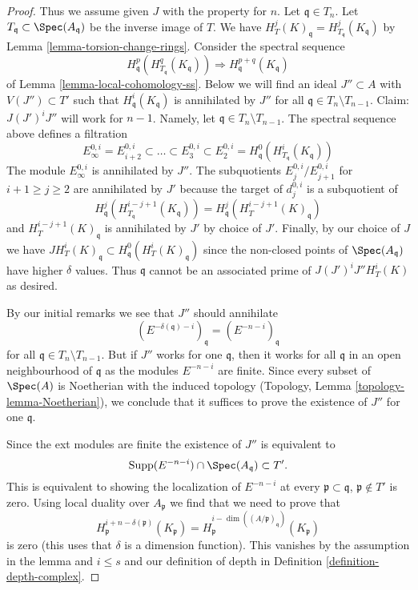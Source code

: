 \begin{proof}
\medskip\noindent
Thus we assume given $J$ with the property for $n$.
Let $\mathfrak q \in T_n$. Let $T_\mathfrak q \subset \Spec(A_\mathfrak q)$
be the inverse image of $T$. We have
$H^j_T(K)_\mathfrak q = H^j_{T_\mathfrak q}(K_\mathfrak q)$
by Lemma \ref{lemma-torsion-change-rings}.
Consider the spectral sequence
$$
H_\mathfrak q^p(H^q_{T_\mathfrak q}(K_\mathfrak q))
\Rightarrow
H^{p + q}_\mathfrak q(K_\mathfrak q)
$$
of Lemma \ref{lemma-local-cohomology-ss}.
Below we will find an ideal $J'' \subset A$ with $V(J'') \subset T'$
such that $H^i_\mathfrak q(K_\mathfrak q)$ is annihilated by $J''$ for all
$\mathfrak q \in T_n \setminus T_{n - 1}$.
Claim: $J (J')^i J''$ will work for $n - 1$.
Namely, let $\mathfrak q \in T_n \setminus T_{n - 1}$.
The spectral sequence above defines a filtration
$$
E_\infty^{0, i} = E_{i + 2}^{0, i} \subset \ldots \subset E_3^{0, i} \subset
E_2^{0, i} = H^0_\mathfrak q(H^i_{T_\mathfrak q}(K_\mathfrak q))
$$
The module $E_\infty^{0, i}$ is annihilated by $J''$.
The subquotients $E_j^{0, i}/E_{j + 1}^{0, i}$ for $i + 1 \geq j \geq 2$
are annihilated by $J'$ because the target of $d_j^{0, i}$
is a subquotient of
$$
H^j_\mathfrak q(H^{i - j + 1}_{T_\mathfrak q}(K_\mathfrak q)) =
H^j_\mathfrak q(H^{i - j + 1}_T(K)_\mathfrak q)
$$
and $H^{i - j + 1}_T(K)_\mathfrak q$ is annihilated by $J'$ by choice of $J'$.
Finally, by our choice of $J$ we have
$J H^i_T(K)_\mathfrak q \subset H^0_\mathfrak q(H^i_T(K)_\mathfrak q)$
since the non-closed points of $\Spec(A_\mathfrak q)$ have higher
$\delta$ values. Thus $\mathfrak q$ cannot be an associated prime of
$J(J')^iJ'' H^i_T(K)$ as desired.

\medskip\noindent
By our initial remarks we see that $J''$ should annihilate
$$
(E^{-\delta(\mathfrak q) - i})_\mathfrak q =
(E^{-n - i})_\mathfrak q
$$
for all $\mathfrak q \in T_n \setminus T_{n - 1}$.
But if $J''$ works for one $\mathfrak q$, then it works for all
$\mathfrak q$ in an open neighbourhood of $\mathfrak q$
as the modules $E^{-n - i}$ are finite.
Since every subset of $\Spec(A)$ is Noetherian with the induced
topology (Topology, Lemma \ref{topology-lemma-Noetherian}),
we conclude that it suffices
to prove the existence of $J''$ for one $\mathfrak q$.

\medskip\noindent
Since the ext modules are finite the existence of $J''$ is
equivalent to
$$
\text{Supp}(E^{-n - i}) \cap \Spec(A_\mathfrak q) \subset T'.
$$
This is equivalent to showing the localization of $E^{-n - i}$ at every
$\mathfrak p \subset \mathfrak q$, $\mathfrak p \not \in T'$
is zero. Using local duality over $A_\mathfrak p$ we find that we need
to prove that
$$
H^{i + n - \delta(\mathfrak p)}_\mathfrak p(K_\mathfrak p) =
H^{i - \dim((A/\mathfrak p)_\mathfrak q)}_\mathfrak p(K_\mathfrak p)
$$
is zero (this uses that $\delta$ is a dimension function).
This vanishes by the assumption in the lemma and $i \leq s$ and
our definition of depth in Definition \ref{definition-depth-complex}.


\end{proof}
